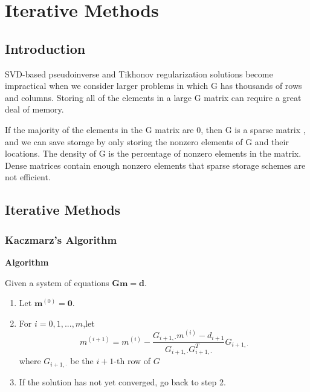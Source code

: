 \documentclass[a4paper]{article}
\newcommand{\tmmathbf}[1]{\ensuremath{\boldsymbol{#1}}}
\newcommand{\tmtextbf}[1]{{\bfseries{#1}}}
\newcommand{\tmtextup}[1]{{\upshape{#1}}}
\newenvironment{enumeratenumeric}{\begin{enumerate}[1.] }{\end{enumerate}}
\newenvironment{tmindent}{\begin{tmparmod}{1.5em}{0pt}{0pt} }{\end{tmparmod}}
\newenvironment{tmparmod}[3]{\begin{list}{}{\setlength{\topsep}{0pt}\setlength{\leftmargin}{#1}\setlength{\rightmargin}{#2}\setlength{\parindent}{#3}\setlength{\listparindent}{\parindent}\setlength{\itemindent}{\parindent}\setlength{\parsep}{\parskip}} \item[]}{\end{list}}
\newenvironment{tmparsep}[1]{\begingroup\setlength{\parskip}{#1}}{\endgroup}
\begin{document}
\section{Iterative Methods}

\subsection{Introduction}

SVD-based pseudoinverse and Tikhonov regularization solutions become
impractical when we consider larger problems in which G has thousands
of rows and columns. Storing all of the elements in a large G matrix can
require a great deal of memory.
\par
If the majority of the elements in the G matrix are 0, then G is a sparse
matrix , and we can save storage by only storing the nonzero elements of G and
their locations. The density of G is the percentage of nonzero elements in the
matrix. Dense matrices contain enough nonzero elements that sparse storage
schemes are not efficient.

\subsection{Iterative Methods}

\subsubsection{Kaczmarz's Algorithm}

{\noindent}\begin{tmparsep}{0em}
  \tmtextbf{Algorithm \tmtextup{1}}{\smallskip}
  \begin{tmindent}
    Given a system of equations $\tmmathbf{G}\tmmathbf{m}=\tmmathbf{d}$.
    \begin{enumeratenumeric}
      \item Let $\tmmathbf{m}^{(0)} =\tmmathbf{0}$.

      \item For $i = 0, 1, ..., m$,let
      \[ m^{\left( i + 1 \right)} = m^{\left( i \right)} - \frac{G_{i + 1,
         \cdot} m^{\left( i \right)} - d_{i + 1}}{G_{i + 1, \cdot} G_{i + 1,
         \cdot}^T} G_{i + 1, \cdot} \]
      where $G_{i + 1, \cdot}$ be the $i + 1$-th row of $G$

      \item If the solution has not yet converged, go back to step 2.
    \end{enumeratenumeric}
  \end{tmindent}
\end{tmparsep}{\hspace*{\fill}}{\medskip}
\end{document}
